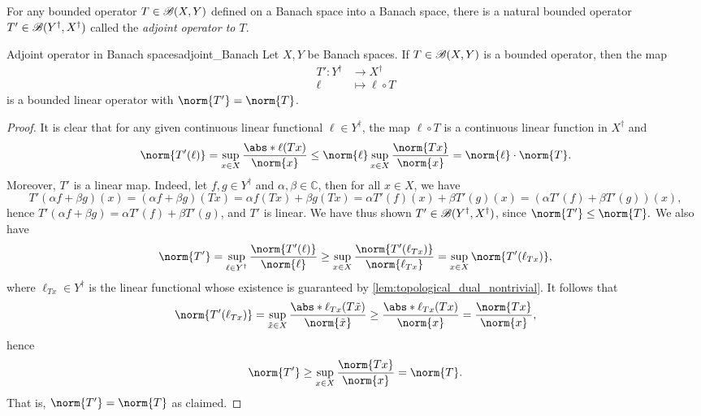 For any bounded operator \(T \in \mathscr{B}(X, Y)\) defined on a Banach space into a Banach space, there is a natural bounded operator \(T' \in \mathscr{B}(Y^\dag, X^\dag)\) called the \emph{adjoint operator to \(T\)}.
\begin{proposition}{Adjoint operator in Banach spaces}{adjoint_Banach}
    Let \(X, Y\) be Banach spaces. If \(T \in \mathscr{B}(X, Y)\) is a bounded operator, then the map
    \begin{align*}
        T' : Y^\dag &\to X^\dag\\
               \ell &\mapsto \ell \circ T
    \end{align*}
    is a bounded linear operator with \(\norm{T'} = \norm{T}\).
\end{proposition}
\begin{proof}
    It is clear that for any given continuous linear functional \(\ell \in Y^\dag\), the map \(\ell \circ T\) is a continuous linear function in \(X^\dag\) and
    \begin{equation*}
        \norm{T'(\ell)} = \sup_{x \in X}\frac{\abs*{\ell(Tx)}}{\norm{x}} \leq \norm{\ell} \sup_{x \in X} \frac{\norm{Tx}}{\norm{x}} = \norm{\ell} \cdot \norm{T}.
    \end{equation*}
    Moreover, \(T'\) is a linear map. Indeed, let \(f,g \in Y^\dag\) and \(\alpha, \beta \in \mathbb{C}\), then for all \(x \in X\), we have
    \begin{equation*}
        T'(\alpha f + \beta g)(x) = (\alpha f + \beta g)(Tx) = \alpha f(Tx) + \beta g(Tx) = \alpha T'(f)(x) + \beta T'(g)(x) = (\alpha T'(f) + \beta T'(g))(x),
    \end{equation*}
    hence \(T'(\alpha f + \beta g) = \alpha T'(f) + \beta T'(g)\), and \(T'\) is linear. We have thus shown \(T' \in \mathscr{B}(Y^\dag, X^\dag)\), since \(\norm{T'} \leq \norm{T}.\) We also have
    \begin{equation*}
        \norm{T'} = \sup_{\ell \in Y^\dag} \frac{\norm{T'(\ell)}}{\norm{\ell}} \geq \sup_{x \in X} \frac{\norm{T'(\ell_{Tx})}}{\norm{\ell_{Tx}}} = \sup_{x \in X} \norm{T'(\ell_{Tx})},
    \end{equation*}
    where \(\ell_{Tx} \in Y^\dag\) is the linear functional whose existence is guaranteed by \cref{lem:topological_dual_nontrivial}. It follows that
    \begin{equation*}
        \norm{T'(\ell_{Tx})} = \sup_{\tilde{x} \in X} \frac{\abs*{\ell_{Tx}(T\tilde{x}})}{\norm{\tilde{x}}} \geq \frac{\abs*{\ell_{Tx}(Tx)}}{\norm{x}} = \frac{\norm{Tx}}{\norm{x}},
    \end{equation*}
    hence
    \begin{equation*}
        \norm{T'} \geq \sup_{x \in X} \frac{\norm{Tx}}{\norm{x}} = \norm{T}.
    \end{equation*}
    That is, \(\norm{T'} = \norm{T}\) as claimed.
\end{proof}
